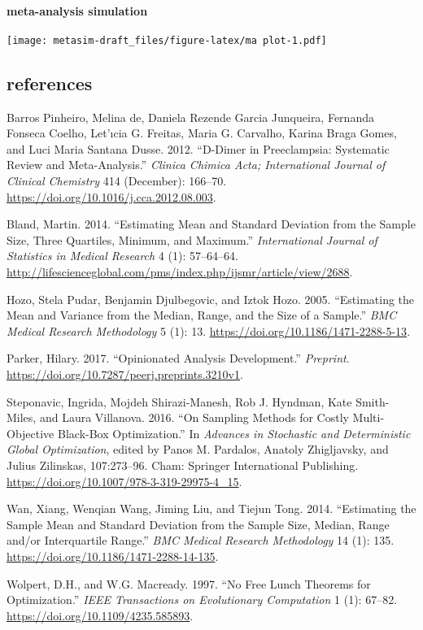 \documentclass[]{article}
\let\oldparagraph\paragraph
\renewcommand{\paragraph}[1]{\oldparagraph{#1}\mbox{}}
\begin{document}
\hypertarget{meta-analysis-simulation}{%
\paragraph{meta-analysis simulation}\label{meta-analysis-simulation}}

\texttt{[image: metasim-draft\_files/figure-latex/ma plot-1.pdf]}

\hypertarget{references}{%
\subsection*{references}\label{references}}

\hypertarget{refs}{}
\leavevmode\hypertarget{ref-pinheiro_d-dimer_2012}{}%
Barros Pinheiro, Melina de, Daniela Rezende Garcia Junqueira, Fernanda
Fonseca Coelho, Let\a'ıcia G. Freitas, Maria G. Carvalho, Karina Braga
Gomes, and Luci Maria Santana Dusse. 2012. ``D-Dimer in Preeclampsia:
Systematic Review and Meta-Analysis.'' \emph{Clinica Chimica Acta;
International Journal of Clinical Chemistry} 414 (December): 166--70.
\url{https://doi.org/10.1016/j.cca.2012.08.003}.

\leavevmode\hypertarget{ref-bland_estimating_2014}{}%
Bland, Martin. 2014. ``Estimating Mean and Standard Deviation from the
Sample Size, Three Quartiles, Minimum, and Maximum.''
\emph{International Journal of Statistics in Medical Research} 4 (1):
57--64--64.
\url{http://lifescienceglobal.com/pms/index.php/ijsmr/article/view/2688}.

\leavevmode\hypertarget{ref-hozo_estimating_2005}{}%
Hozo, Stela Pudar, Benjamin Djulbegovic, and Iztok Hozo. 2005.
``Estimating the Mean and Variance from the Median, Range, and the Size
of a Sample.'' \emph{BMC Medical Research Methodology} 5 (1): 13.
\url{https://doi.org/10.1186/1471-2288-5-13}.

\leavevmode\hypertarget{ref-parker_opinionated_2017}{}%
Parker, Hilary. 2017. ``Opinionated Analysis Development.''
\emph{Preprint}. \url{https://doi.org/10.7287/peerj.preprints.3210v1}.

\leavevmode\hypertarget{ref-pardalos_sampling_2016}{}%
Steponavic, Ingrida, Mojdeh Shirazi-Manesh, Rob J. Hyndman, Kate
Smith-Miles, and Laura Villanova. 2016. ``On Sampling Methods for Costly
Multi-Objective Black-Box Optimization.'' In \emph{Advances in
Stochastic and Deterministic Global Optimization}, edited by Panos M.
Pardalos, Anatoly Zhigljavsky, and Julius Zilinskas, 107:273--96. Cham:
Springer International Publishing.
\url{https://doi.org/10.1007/978-3-319-29975-4_15}.

\leavevmode\hypertarget{ref-wan_estimating_2014}{}%
Wan, Xiang, Wenqian Wang, Jiming Liu, and Tiejun Tong. 2014.
``Estimating the Sample Mean and Standard Deviation from the Sample
Size, Median, Range and/or Interquartile Range.'' \emph{BMC Medical
Research Methodology} 14 (1): 135.
\url{https://doi.org/10.1186/1471-2288-14-135}.

\leavevmode\hypertarget{ref-wolpert_no_1997}{}%
Wolpert, D.H., and W.G. Macready. 1997. ``No Free Lunch Theorems for
Optimization.'' \emph{IEEE Transactions on Evolutionary Computation} 1
(1): 67--82. \url{https://doi.org/10.1109/4235.585893}.
\end{document}
